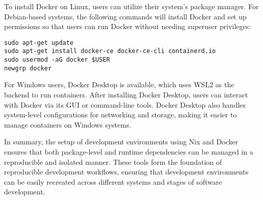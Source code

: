 To install Docker on Linux,
users can utilize their system’s package manager. For Debian-based systems,
the following commands will install Docker and set up permissions so that users can
run Docker without needing superuser privileges:

\begin{lstlisting}[caption={Installing Docker on Linux}]
sudo apt-get update
sudo apt-get install docker-ce docker-ce-cli containerd.io
sudo usermod -aG docker $USER
newgrp docker
\end{lstlisting}

For Windows users, Docker Desktop is available, which uses WSL2 as the backend to
run containers. After installing Docker Desktop, users can interact with Docker
via its GUI or command-line tools. Docker Desktop also
handles system-level configurations for networking and storage, making it easier
to manage containers on Windows systems.

In summary, the setup of development environments using Nix and Docker ensures
that both package-level and runtime dependencies can be managed in a reproducible
and isolated manner. These tools form the foundation of reproducible development
workflows, ensuring that development environments can be easily recreated across
different systems and stages of software development.
